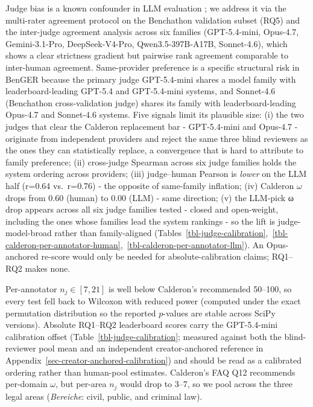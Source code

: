 \documentclass[11pt]{article}
\begin{document}
Judge bias is a known confounder in LLM evaluation
\citep{zheng2023mtbench, panickssery2024self}; we address it via the
multi-rater agreement protocol on the Benchathon validation subset (RQ5)
and the inter-judge agreement analysis across six families
(GPT-5.4-mini, Opus-4.7, Gemini-3.1-Pro, DeepSeek-V4-Pro,
Qwen3.5-397B-A17B, Sonnet-4.6), which shows a clear strictness gradient
but pairwise rank agreement comparable to inter-human agreement.
Same-provider preference is a specific structural risk in BenGER because
the primary judge GPT-5.4-mini shares a model family with
leaderboard-leading GPT-5.4 and GPT-5.4-mini systems, and Sonnet-4.6
(Benchathon cross-validation judge) shares its family with
leaderboard-leading Opus-4.7 and Sonnet-4.6 systems. Five signals limit
its plausible size: (i) the two judges that clear the Calderon
replacement bar - GPT-5.4-mini and Opus-4.7 - originate from independent
providers and reject the same three blind reviewers as the ones they can
statistically replace, a convergence that is hard to attribute to family
preference; (ii) cross-judge Spearman across six judge families holds
the system ordering across providers; (iii) judge--human Pearson is
\emph{lower} on the LLM half (r=0.64 vs.~r=0.76) - the opposite of
same-family inflation; (iv) Calderon \(\omega\) drops from 0.60 (human)
to 0.00 (LLM) - same direction; (v) the LLM-pick ω drop appears across
all six judge families tested - closed and open-weight, including the
ones whose families lead the system rankings - so the lift is
judge-model-broad rather than family-aligned
(Tables~\ref{tbl-judge-calibration},~\ref{tbl-calderon-per-annotator-human},~\ref{tbl-calderon-per-annotator-llm}).
An Opus-anchored re-score would only be needed for absolute-calibration
claims; RQ1--RQ2 makes none.

Per-annotator \(n_j \in [7, 21]\) is well below Calderon's recommended
50--100, so every test fell back to Wilcoxon with reduced power
(computed under the exact permutation distribution so the reported
\(p\)-values are stable across SciPy versions). Absolute RQ1--RQ2
leaderboard scores carry the GPT-5.4-mini calibration offset
(Table~\ref{tbl-judge-calibration}; measured against both the
blind-reviewer pool mean and an independent creator-anchored reference
in Appendix~\ref{sec-creator-anchored-calibration}) and should be read
as a calibrated ordering rather than human-pool estimates. Calderon's
FAQ Q12 recommends per-domain \(\omega\), but per-area \(n_j\) would
drop to 3--7, so we pool across the three legal areas (\emph{Bereiche}:
civil, public, and criminal law).
\end{document}
